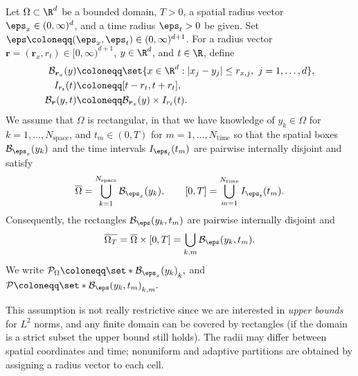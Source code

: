 \begin{assumption}\label{assumption:rectangular-domain}
  Let $\Omega \subset \R^d$ be a bounded domain, $T>0$, a spatial radius
  vector $\boldsymbol{\eps}_x\in(0,\infty)^d$, and a time radius
  $\eps_t>0$ be given. Set
  $\boldsymbol{\eps}\coloneqq(\boldsymbol{\eps}_x,\eps_t)\in(0,\infty)^{d+1}$.
  For a radius vector
  $\boldsymbol r=(\boldsymbol r_x,r_t)\in[0,\infty)^{d+1}$,
  $y\in\R^d$, and $t\in\R$, define
  \begin{equation}\label{quad-spacetime-box}
    \begin{aligned}
      \mathcal B_{\boldsymbol r_x}(y)
      &\coloneqq
      \set{x\in\R^d: |x_j-y_j|\leq r_{x,j},\ j=1,\dots,d},\\
      I_{r_t}(t)&\coloneqq[t-r_t,t+r_t],\\
      \mathcal B_{\boldsymbol r}(y,t)
      &\coloneqq
      \mathcal B_{\boldsymbol r_x}(y)\times I_{r_t}(t).
    \end{aligned}
  \end{equation}
  We assume that $\Omega$ is rectangular, in that we have knowledge of $y_k\in\Omega$ for $k=1,\dots,N_{\mathrm{space}}$, and
  $t_m\in(0, T)$ for $m=1,\dots,N_{\mathrm{time}}$ so that the spatial boxes $\mathcal B_{\boldsymbol{\eps}_x}(y_k)$ and the time intervals $I_{\eps_t}(t_m)$ are pairwise internally disjoint and satisfy
  \[
    \overline{\Omega}
    =
    \bigcup_{k=1}^{N_{\mathrm{space}}}\mathcal B_{\boldsymbol{\eps}_x}(y_k),
    \qquad
    [0,T]
    =
    \bigcup_{m=1}^{N_{\mathrm{time}}} I_{\eps_t}(t_m).
  \]
  Consequently, the rectangles $\mathcal B_{\boldsymbol{\eps}}(y_k,t_m)$ are pairwise internally disjoint and
  \[
    \overline{\Omega_T}
    =
    \overline{\Omega}\times[0,T]
    =
    \bigcup_{k, m}
    \mathcal B_{\boldsymbol{\eps}}(y_k,t_m).
  \]
  We write
  \(
    \mathcal P_\Omega
    \coloneqq
    \set*{\mathcal B_{\boldsymbol{\eps}_x}(y_k)}_k,
  \) and
  \(  \mathcal P
    \coloneqq
    \set*{\mathcal B_{\boldsymbol{\eps}}(y_k,t_m)}_{k,m}.
  \)
\end{assumption}

This assumption is not really restrictive since we are interested in \emph{upper bounds} for $L^2$ norms, and any finite domain can be covered by rectangles (if the domain is a strict subset the upper bound still holds). The radii may differ between spatial coordinates and time; nonuniform and adaptive partitions are obtained by assigning a radius vector to each cell.



